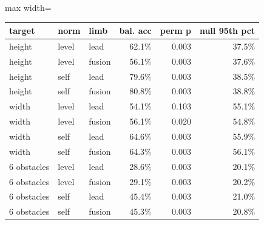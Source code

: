 \begin{adjustbox}{max width=\textwidth}
{\footnotesize
\begin{tabular}{lllrrr}
\toprule
\textbf{target} & \textbf{norm} & \textbf{limb} & \textbf{bal. acc} & \textbf{perm p} & \textbf{null 95th pct} \\
\midrule
height & level & lead & 62.1\% & 0.003 & 37.5\% \\
height & level & fusion & 56.1\% & 0.003 & 37.6\% \\
height & self & lead & 79.6\% & 0.003 & 38.5\% \\
height & self & fusion & 80.8\% & 0.003 & 38.8\% \\
width & level & lead & 54.1\% & 0.103 & 55.1\% \\
width & level & fusion & 56.1\% & 0.020 & 54.8\% \\
width & self & lead & 64.6\% & 0.003 & 55.9\% \\
width & self & fusion & 64.3\% & 0.003 & 56.1\% \\
6 obstacles & level & lead & 28.6\% & 0.003 & 20.1\% \\
6 obstacles & level & fusion & 29.1\% & 0.003 & 20.2\% \\
6 obstacles & self & lead & 45.4\% & 0.003 & 21.0\% \\
6 obstacles & self & fusion & 45.3\% & 0.003 & 20.8\% \\
\bottomrule
\end{tabular}
}
\end{adjustbox}
